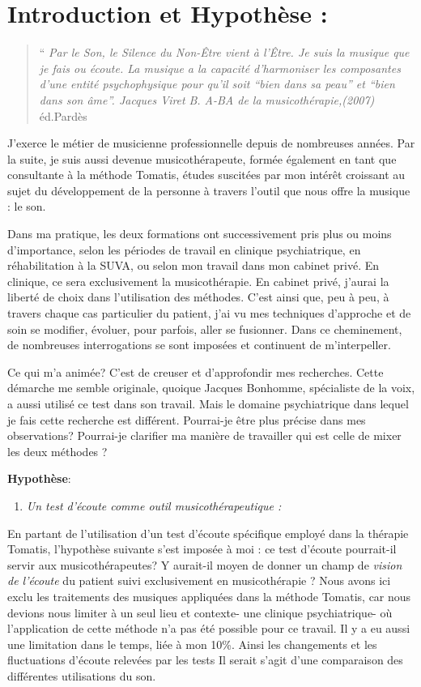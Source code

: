\documentclass[12pt,french]{report}
\makeatletter
\let\SF@@footnote\footnote
\def\footnote{\ifx\protect\@typeset@protect
    \expandafter\SF@@footnote
  \else
    \expandafter\SF@gobble@opt
  \fi
}
\edef\SF@gobble@opt{\noexpand\protect
  \expandafter\noexpand\csname SF@gobble@opt \endcsname}
\makeatother
\begin{document}
\chapter{Introduction et Hypothèse : }
\begin{quotation}
``\emph{ Par le Son, le Silence du Non-Être vient à l'Être. Je suis
la musique que je fais ou écoute. La musique a la capacité d'harmoniser
les composantes d'une entité psychophysique pour qu'il soit ``bien
dans sa peau'' et ``bien dans son âme''. Jacques Viret }\footnote{\emph{B. A-BA de la musicothérapie,(2007)} éd.Pardès}
\end{quotation}
J'exerce le métier de musicienne professionnelle depuis de nombreuses
années. Par la suite, je suis aussi devenue musicothérapeute, formée
également en tant que consultante à la méthode Tomatis, études suscitées
par mon intérêt croissant au sujet du développement de la personne
à travers l'outil que nous offre la musique : le son.

Dans ma pratique, les deux formations ont successivement pris plus
ou moins d'importance, selon les périodes de travail en clinique psychiatrique,
en réhabilitation à la SUVA, ou selon mon travail dans mon cabinet
privé. En clinique, ce sera exclusivement la musicothérapie. En cabinet
privé, j'aurai la liberté de choix dans l'utilisation des méthodes.
C'est ainsi que, peu à peu, à travers chaque cas particulier du patient,
j'ai vu mes techniques d'approche et de soin se modifier, évoluer,
pour parfois, aller se fusionner. Dans ce cheminement, de nombreuses
interrogations se sont imposées et continuent de m'interpeller.

Ce qui m'a animée? C'est de creuser et d'approfondir mes recherches.
Cette démarche me semble originale, quoique Jacques Bonhomme, spécialiste de la voix, a aussi utilisé ce test dans son travail. Mais le domaine psychiatrique dans lequel je fais cette  recherche est différent.
 Pourrai-je être plus précise dans mes
observations? Pourrai-je clarifier ma manière de travailler qui est celle de mixer les deux méthodes ?

\textbf{Hypothèse}:\\ 
\begin{enumerate}
	\item \textit{Un test d'écoute comme outil musicothérapeutique :}
\end{enumerate}

En partant de l'utilisation d'un test d'écoute spécifique employé
dans la thérapie  Tomatis, l'hypothèse suivante s'est imposée à moi : ce test d'écoute
pourrait-il servir aux musicothérapeutes? Y aurait-il moyen de donner
un champ de \emph{vision de l'écoute }du patient suivi exclusivement
en musicothérapie ? Nous avons ici exclu les traitements des musiques appliquées dans la méthode Tomatis, car nous devions nous limiter à un seul lieu et contexte- une clinique psychiatrique- où l'application de cette méthode n'a pas été possible pour ce travail.  Il y a eu aussi une limitation dans le temps, liée à mon 10\%. Ainsi les changements et les fluctuations d'écoute relevées par les tests Il serait s'agit d'une comparaison des différentes utilisations du son.
\end{document}
